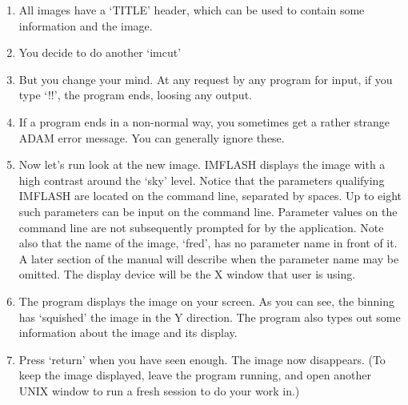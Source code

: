 {\begin{enumerate}
\item All images have a `TITLE' header, which can be used to contain
      some information and the image.

\item You decide to do another `imcut'

\item But you change your mind. At any request by any program for input,
      if you type `!!', the program ends, loosing any output.

\item If a program ends in a non-normal way, you sometimes get a rather
      strange ADAM error message. You can generally ignore these.

\item Now let's run look at the new image. IMFLASH displays the image with
      a high contrast around the `sky' level. Notice that the parameters
      qualifying IMFLASH are located on the command line, separated by spaces.
      Up to eight such parameters can be input on the command line. Parameter
      values on the command line are not subsequently prompted for by the
      application. Note also that the name of the image, `fred', has no parameter
      name in front of it. A later section of the manual will describe when the
      parameter name may be omitted. The display device will be the X window
      that user is using.

\item The program displays the image on your screen.
      As you can see, the binning has `squished' the image in the Y direction.
      The program also types out some information about the image and its
      display.

\item Press `return' when you have seen enough. The image now disappears.
      (To keep the image displayed, leave the program running, and open
       another UNIX window to run a fresh \starman session to do your
       work in.)

\end{enumerate}
}

\newpage

